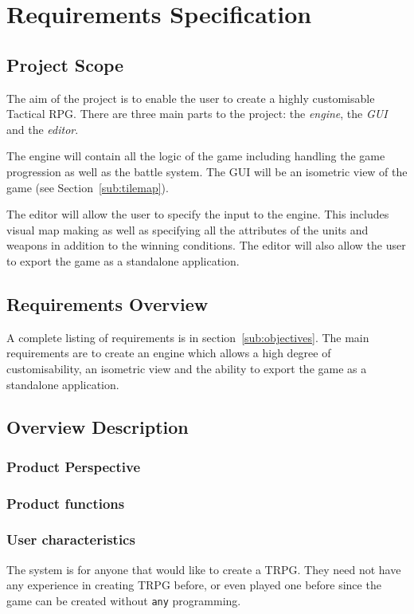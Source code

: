 \section{Requirements Specification}
\label{sec:requirements_specification}

\subsection{Project Scope}
\label{sub:project_scope}

The aim of the project is to enable the user to create a highly customisable Tactical RPG.  There are three main parts to the project: the \emph{engine}, the \emph{GUI} and the \emph{editor}.

The engine will contain all the logic of the game including handling the game progression as well as the battle system. The GUI will be an isometric view of the game (see Section~\ref{sub:tilemap}). 

The editor will allow the user to specify the input to the engine. This includes visual map making as well as specifying all the attributes of the units and weapons in addition to the winning conditions.  The editor will also allow the user to export the game as a standalone application.

\subsection{Requirements Overview}
\label{sub:overview}
A complete listing of requirements is in section~\ref{sub:objectives}. The main requirements are to create an engine which allows a high degree of customisability, an isometric view and the ability to export the game as a standalone application.  

\subsection{Overview Description}
\subsubsection{Product Perspective}

\subsubsection{Product functions}

\subsubsection{User characteristics}
The system is for anyone that would like to create a TRPG.  They need not have any experience in creating TRPG before, or even played one before since the game can be created without \texttt{any} programming. 

